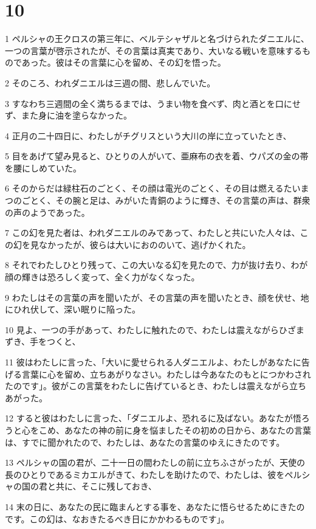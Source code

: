 \chapter{10}

\par 1 ペルシャの王クロスの第三年に、ベルテシャザルと名づけられたダニエルに、一つの言葉が啓示されたが、その言葉は真実であり、大いなる戦いを意味するものであった。彼はその言葉に心を留め、その幻を悟った。
\par 2 そのころ、われダニエルは三週の間、悲しんでいた。
\par 3 すなわち三週間の全く満ちるまでは、うまい物を食べず、肉と酒とを口にせず、また身に油を塗らなかった。
\par 4 正月の二十四日に、わたしがチグリスという大川の岸に立っていたとき、
\par 5 目をあげて望み見ると、ひとりの人がいて、亜麻布の衣を着、ウパズの金の帯を腰にしめていた。
\par 6 そのからだは緑柱石のごとく、その顔は電光のごとく、その目は燃えるたいまつのごとく、その腕と足は、みがいた青銅のように輝き、その言葉の声は、群衆の声のようであった。
\par 7 この幻を見た者は、われダニエルのみであって、わたしと共にいた人々は、この幻を見なかったが、彼らは大いにおののいて、逃げかくれた。
\par 8 それでわたしひとり残って、この大いなる幻を見たので、力が抜け去り、わが顔の輝きは恐ろしく変って、全く力がなくなった。
\par 9 わたしはその言葉の声を聞いたが、その言葉の声を聞いたとき、顔を伏せ、地にひれ伏して、深い眠りに陥った。
\par 10 見よ、一つの手があって、わたしに触れたので、わたしは震えながらひざまずき、手をつくと、
\par 11 彼はわたしに言った、「大いに愛せられる人ダニエルよ、わたしがあなたに告げる言葉に心を留め、立ちあがりなさい。わたしは今あなたのもとにつかわされたのです」。彼がこの言葉をわたしに告げているとき、わたしは震えながら立ちあがった。
\par 12 すると彼はわたしに言った、「ダニエルよ、恐れるに及ばない。あなたが悟ろうと心をこめ、あなたの神の前に身を悩ましたその初めの日から、あなたの言葉は、すでに聞かれたので、わたしは、あなたの言葉のゆえにきたのです。
\par 13 ペルシャの国の君が、二十一日の間わたしの前に立ちふさがったが、天使の長のひとりであるミカエルがきて、わたしを助けたので、わたしは、彼をペルシャの国の君と共に、そこに残しておき、
\par 14 末の日に、あなたの民に臨まんとする事を、あなたに悟らせるためにきたのです。この幻は、なおきたるべき日にかかわるものです」。
